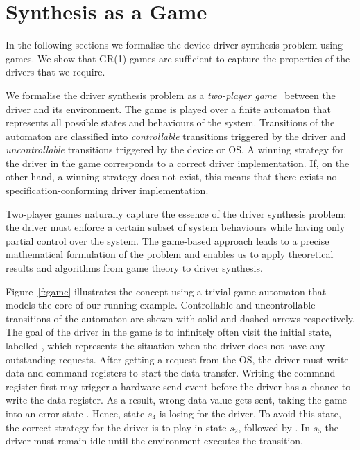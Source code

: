 \chapter{Synthesis as a Game}

In the following sections we formalise the device driver synthesis problem using games. We show that GR(1) games are sufficient to capture the properties of the drivers that we require.

We formalise the driver synthesis problem as a \emph{two-player game}~\cite{Thomas_95} between the driver and its environment. The game is played over a finite automaton that represents all possible states and behaviours of the system. Transitions of the automaton are classified into \emph{controllable} transitions triggered by the driver and \emph{uncontrollable} transitions triggered by the device or OS. A winning strategy for the driver in the game corresponds to a correct driver implementation. If, on the other hand, a winning strategy does not exist, this means that there exists no specification-conforming driver implementation.

Two-player games naturally capture the essence of the driver synthesis problem: the driver must enforce a certain subset of system behaviours while having only partial control over the system. The game-based approach leads to a precise mathematical formulation of the problem and enables us to apply theoretical results and algorithms from game theory to driver synthesis.

Figure~\ref{f:game} illustrates the concept using a trivial game automaton that models the core of our running example. Controllable and uncontrollable transitions of the automaton are shown with solid and dashed arrows respectively.  The goal of the driver in the game is to infinitely often visit the initial state, labelled , which represents the situation when the driver does not have any outstanding requests.  After getting a  request from the OS, the driver must write data and command registers to start the data transfer.  Writing the command register first may trigger a hardware send event before the driver has a chance to write the data register.  As a result, wrong data value gets sent, taking the game into an error state .  Hence, state $s_4$ is losing for the driver.  To avoid this state, the correct strategy for the driver is to play  in state $s_2$, followed by .  In $s_5$ the driver must remain idle until the environment executes the  transition.

